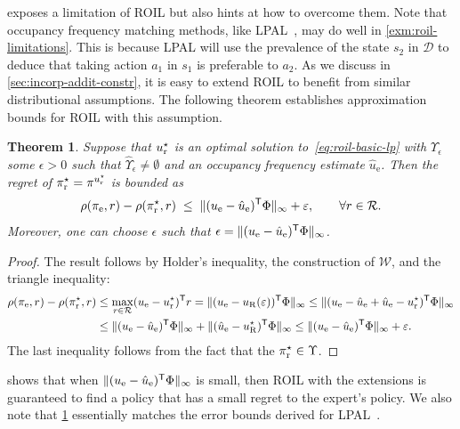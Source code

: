 \documentclass[10pt]{article}
\renewcommand{\cite}{\citep}
\theoremstyle{plain}
\newtheorem{theorem}{Theorem}
\theoremstyle{remark}
\begin{document}
 exposes a limitation of ROIL but also hints at how to overcome them. Note that occupancy frequency matching methods, like LPAL~\cite{Syed2008}, may do well in \cref{exm:roil-limitations}. This is because LPAL will use the prevalence of the state $s_2$ in $\mathcal{D}$ to deduce that taking action $a_1$ in $s_1$ is preferable to $a_2$. As we discuss in \cref{sec:incorp-addit-constr}, it is easy to extend ROIL to benefit from similar distributional assumptions. The following theorem establishes approximation bounds for ROIL with this assumption. 
\begin{theorem} \label{roilRegretBound}
Suppose that $u_{\mathrm{r}}^{\mathnormal{\star}}$ is an optimal solution to~\eqref{eq:roil-basic-lp} with $\Upsilon_{\epsilon}$ some $\epsilon>0$ such that $\hat{\Upsilon}_{\epsilon} \neq \emptyset$ and an occupancy frequency estimate $\hat{u}_{\mathrm{e}}$. Then the regret of $\pi_{\mathrm{r}}^{\mathnormal{\star}}  = \pi^{u^{\mathnormal{\star}}_{\mathrm{r}}}$ is bounded as
\[
 \rho(\pi_{\mathrm{e}}, r) - \rho(\pi_{\mathrm{r}}^{\mathnormal{\star}}, r)
\;\leq\;
\| (u_{\mathrm{e}} - \hat{u}_{\mathrm{e}})^{\mathsf{T}} \Phi \|_\infty + \varepsilon,
\qquad \forall r\in \mathcal{R}.
\]
Moreover, one can choose $\epsilon$ such that $ \epsilon = \| (u_{\mathrm{e}} - \hat{u}_{\mathrm{e}})^{\mathsf{T}} \Phi \|_\infty$.
\end{theorem}
\begin{proof}
The result follows by Holder's inequality, the construction of $\mathcal{W}$, and the triangle inequality:
\begin{align*}
\rho(\pi_{\mathrm{e}}, r) - \rho(\pi_{\mathrm{r}}^{\mathnormal{\star}}, r)
  &\le  \max_{r\in\mathcal{R}} (u_{\mathrm{e}} - u_{\mathrm{r}}^{\mathnormal{\star}})^{\mathsf{T}} r
    = \| (u_{\mathrm{e}} - u_{\mathrm{R}}(\varepsilon))^{\mathsf{T}} \Phi \|_\infty
    \leq \| (u_{\mathrm{e}} - \hat{u}_{\mathrm{e}} + \hat{u}_{\mathrm{e}} - u_{\mathrm{r}}^{\mathnormal{\star}})^{\mathsf{T}} \Phi \|_\infty \\
&\leq \| (u_{\mathrm{e}}-\hat{u}_{\mathrm{e}})^{\mathsf{T}} \Phi \|_\infty + \| (\hat{u}_{\mathrm{e}} - u_{\mathrm{R}}^{\mathnormal{\star}})^{\mathsf{T}} \Phi \|_\infty \leq  \| (u_{\mathrm{e}}-\hat{u}_{\mathrm{e}})^{\mathsf{T}} \Phi \|_\infty + \varepsilon.
\end{align*}
The last inequality follows from the fact that the $\pi_{\mathrm{r}}^{\mathnormal{\star}}  \in \Upsilon$.
\end{proof}

 shows that when $\| (u_{\mathrm{e}} - \hat{u}_{\mathrm{e}})^{\mathsf{T}} \Phi \|_\infty $ is small, then ROIL with the extensions is guaranteed to find a policy that has a small regret to the expert's policy. We also note that \cref{roilRegretBound} essentially matches the error bounds derived for LPAL~\cite{Syed2008}.
\end{document}
